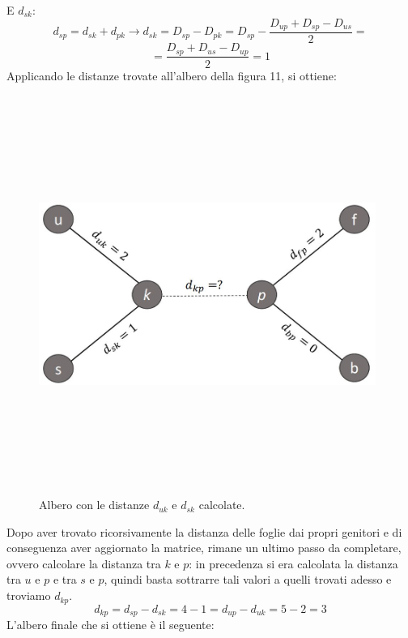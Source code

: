 E $d_{sk}$:
\[d_{sp}=d_{sk}+d_{pk} \rightarrow d_{sk}=D_{sp}-D_{pk}=D_{sp}-\frac{D_{up}+D_{sp}-D_{us}}2=\]
\[=\frac{D_{sp}+D_{us}-D_{up}}2=1\]
Applicando le distanze trovate all'albero della figura 11, si ottiene:
\newpage
\begin{figure}[h!]
\centering
	\includegraphics[height=13cm, width=11cm, keepaspectratio]{distance_between_s_u_part_2.jpg}
 	\caption{Albero con le distanze $d_{uk}$ e $d_{sk}$ calcolate.}
  	\label{fig:neighborsleaves_3}
\end{figure}
Dopo aver trovato ricorsivamente la distanza delle foglie dai propri genitori e di conseguenza aver aggiornato la matrice, rimane un ultimo passo da completare, ovvero calcolare la distanza tra $k$ e $p$: in precedenza si era calcolata la distanza tra $u$ e $p$ e tra $s$ e $p$, quindi basta sottrarre tali valori a quelli trovati adesso e troviamo $d_{kp}$.
\[d_{kp}=d_{sp}-d_{sk}=4-1=d_{up}-d_{uk}=5-2=3\]
L'albero finale che si ottiene è il seguente:
